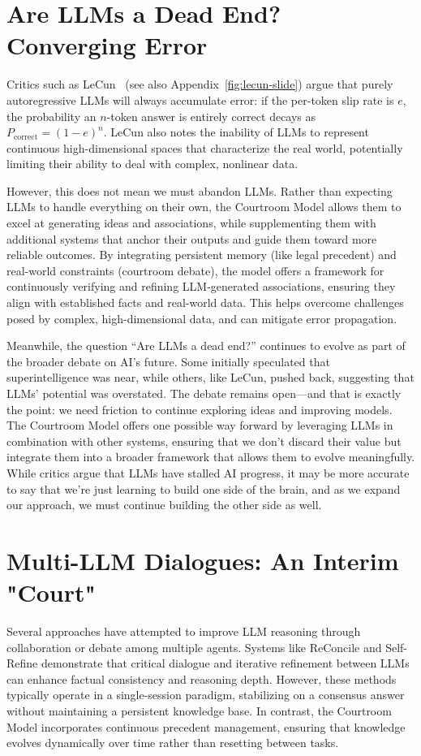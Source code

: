 \documentclass[11pt]{article}
\begin{document}
\section{Are LLMs a Dead End? Converging Error}
Critics such as LeCun \citep{LeCun2023SFI}\,%
(see also Appendix~\ref{fig:lecun-slide}) argue that
purely autoregressive LLMs will always accumulate error:
if the per-token slip rate is $e$, the probability an
$n$-token answer is entirely correct decays as
$P_{\mathrm{correct}} = (1-e)^{n}$.
LeCun also notes the inability of LLMs to represent continuous high-dimensional spaces that characterize the real world, potentially limiting their ability to deal with complex, nonlinear data.

However, this does not mean we must abandon LLMs. Rather than expecting LLMs to handle everything on their own, the Courtroom Model allows them to excel at generating ideas and associations, while supplementing them with additional systems that anchor their outputs and guide them toward more reliable outcomes. By integrating persistent memory (like legal precedent) and real-world constraints (courtroom debate), the model offers a framework for continuously verifying and refining LLM-generated associations, ensuring they align with established facts and real-world data. This helps overcome challenges posed by complex, high-dimensional data, and can mitigate error propagation.

Meanwhile, the question “Are LLMs a dead end?” continues to evolve as part of the broader debate on AI's future. Some initially speculated that superintelligence was near, while others, like LeCun, pushed back, suggesting that LLMs' potential was overstated. The debate remains open—and that is exactly the point: we need friction to continue exploring ideas and improving models. The Courtroom Model offers one possible way forward by leveraging LLMs in combination with other systems, ensuring that we don't discard their value but integrate them into a broader framework that allows them to evolve meaningfully. While critics argue that LLMs have stalled AI progress, it may be more accurate to say that we're just learning to build one side of the brain, and as we expand our approach, we must continue building the other side as well.

\section{Multi-LLM Dialogues: An Interim "Court"}
\label{sec:multi-llm}
Several approaches have attempted to improve LLM reasoning through collaboration or debate among multiple agents. Systems like ReConcile \citep{chen2024reconcile} and Self-Refine \citep{madaan2023selfrefine} demonstrate that critical dialogue and iterative refinement between LLMs can enhance factual consistency and reasoning depth. However, these methods typically operate in a single-session paradigm, stabilizing on a consensus answer without maintaining a persistent knowledge base. In contrast, the Courtroom Model incorporates continuous precedent management, ensuring that knowledge evolves dynamically over time rather than resetting between tasks.
\end{document}
